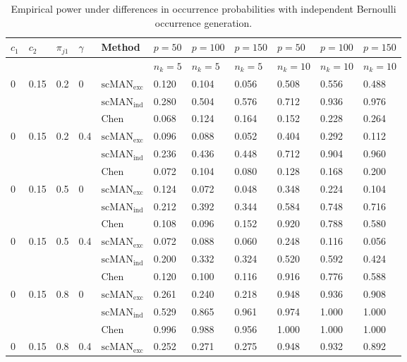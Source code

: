 \begin{table}[H]
\scriptsize
\centering
\caption{Empirical power under differences in occurrence probabilities with independent Bernoulli occurrence generation.}
\label{tab:occurrence-power-independent}
\begin{tabular}{lllllllllll}
\hline
$c_1$ & $c_2$ & $\pi_{j1}$ & $\gamma$ & Method & $p=50$ & $p=100$ & $p=150$ & $p=50$ & $p=100$ & $p=150$ \\
\hline
& & & & & $n_k=5$ & $n_k=5$ & $n_k=5$ & $n_k=10$ & $n_k=10$ & $n_k=10$ \\
0 & 0.15 & 0.2 & 0 & $\mathrm{scMAN}_{\mathrm{exc}}$ & 0.120 & 0.104 & 0.056 & 0.508 & 0.556 & 0.488 \\
 &  &  &  & $\mathrm{scMAN}_{\mathrm{ind}}$ & 0.280 & 0.504 & 0.576 & 0.712 & 0.936 & 0.976 \\
 &  &  &  & Chen & 0.068 & 0.124 & 0.164 & 0.152 & 0.228 & 0.264 \\
0 & 0.15 & 0.2 & 0.4 & $\mathrm{scMAN}_{\mathrm{exc}}$ & 0.096 & 0.088 & 0.052 & 0.404 & 0.292 & 0.112 \\
 &  &  &  & $\mathrm{scMAN}_{\mathrm{ind}}$ & 0.236 & 0.436 & 0.448 & 0.712 & 0.904 & 0.960 \\
 &  &  &  & Chen & 0.072 & 0.104 & 0.080 & 0.128 & 0.168 & 0.200 \\
0 & 0.15 & 0.5 & 0 & $\mathrm{scMAN}_{\mathrm{exc}}$ & 0.124 & 0.072 & 0.048 & 0.348 & 0.224 & 0.104 \\
 &  &  &  & $\mathrm{scMAN}_{\mathrm{ind}}$ & 0.212 & 0.392 & 0.344 & 0.584 & 0.748 & 0.716 \\
 &  &  &  & Chen & 0.108 & 0.096 & 0.152 & 0.920 & 0.788 & 0.580 \\
0 & 0.15 & 0.5 & 0.4 & $\mathrm{scMAN}_{\mathrm{exc}}$ & 0.072 & 0.088 & 0.060 & 0.248 & 0.116 & 0.056 \\
 &  &  &  & $\mathrm{scMAN}_{\mathrm{ind}}$ & 0.200 & 0.332 & 0.324 & 0.520 & 0.592 & 0.424 \\
 &  &  &  & Chen & 0.120 & 0.100 & 0.116 & 0.916 & 0.776 & 0.588 \\
0 & 0.15 & 0.8 & 0 & $\mathrm{scMAN}_{\mathrm{exc}}$ & 0.261 & 0.240 & 0.218 & 0.948 & 0.936 & 0.908 \\
 &  &  &  & $\mathrm{scMAN}_{\mathrm{ind}}$ & 0.529 & 0.865 & 0.961 & 0.974 & 1.000 & 1.000 \\
 &  &  &  & Chen & 0.996 & 0.988 & 0.956 & 1.000 & 1.000 & 1.000 \\
0 & 0.15 & 0.8 & 0.4 & $\mathrm{scMAN}_{\mathrm{exc}}$ & 0.252 & 0.271 & 0.275 & 0.948 & 0.932 & 0.892 \\

\end{tabular}
\end{table}
